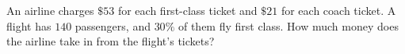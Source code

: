 An airline charges $\$53$ for each first-class ticket and $\$21$ for each coach ticket. A flight has $140$ passengers, and $30\%$ of them fly first class. How much money does the airline take in from the flight's tickets?
